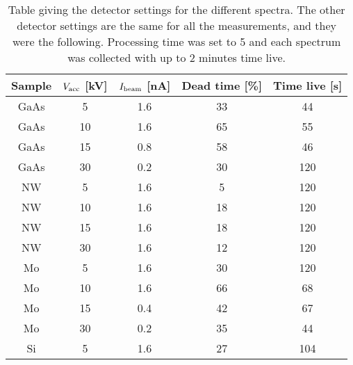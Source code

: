 \begin{table}[ht]
    \centering
    \caption{
        Table giving the detector settings for the different spectra.
        The other detector settings are the same for all the measurements, and they were the following.
        Processing time was set to 5 and each spectrum was collected with up to 2 minutes time live.
    }
    \label{tab:method:detector:settings}
    \begin{tabular}{ccccc}
        Sample & $V_\textnormal{acc}$ {[kV]} & $I_\textnormal{beam}$ {[nA]} & Dead time [\%] & Time live [s] \\
        \hline
        GaAs   & 5                           & 1.6                          & 33             & 44            \\
        GaAs   & 10                          & 1.6                          & 65             & 55            \\
        GaAs   & 15                          & 0.8                          & 58             & 46            \\
        GaAs   & 30                          & 0.2                          & 30             & 120           \\
        NW     & 5                           & 1.6                          & 5              & 120           \\
        NW     & 10                          & 1.6                          & 18             & 120           \\
        NW     & 15                          & 1.6                          & 18             & 120           \\
        NW     & 30                          & 1.6                          & 12             & 120           \\
        Mo     & 5                           & 1.6                          & 30             & 120           \\
        Mo     & 10                          & 1.6                          & 66             & 68            \\
        Mo     & 15                          & 0.4                          & 42             & 67            \\
        Mo     & 30                          & 0.2                          & 35             & 44            \\
        Si     & 5                           & 1.6                          & 27             & 104           \\

\end{tabular}
\end{table}
